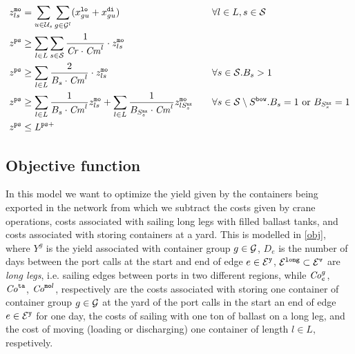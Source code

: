 \begin{alignat}{4}
\label{defMoves}
&z^\ttt{mo}_{ls} = \sum_{u\in \mc{U}_{s}}\sum_{g\in \mc{G}^l}(x^\ttt{lo}_{gu} + x^\ttt{di}_{gu}) 
																																											&&\forall l\in L, s\in \mc{S}\\
\label{minPortStay}
&z^{\ttt{ps}} \geq \sum_{l\in L}\sum_{s\in\mc{S}} \frac{1}{\mi{Cr}\cdot \mi{Cm}^{l}}\cdot z^\ttt{mo}_{ls} \\
%
\label{longCrane}
&z^{\ttt{ps}} \geq \sum_{l\in L}\frac{2}{B_{s}\cdot \mi{Cm}^{l}}\cdot z^\ttt{mo}_{ls}	&& \forall s\in\mc{S}. B_s > 1\\
%
\label{longCrane1Bay}
&z^\ttt{ps} \geq \sum_{l\in L}\frac{1}{B_s\cdot \mi{Cm}^l} z^\ttt{mo}_{ls} + \sum_{l\in L}\frac{1}{B_{S^\ttt{nx}_s}\cdot \mi{Cm}^{l}} z^\ttt{mo}_{lS^\ttt{nx}_s}\quad	
																																											&& \forall s\in\mc{S}\setminus S^\ttt{bow}. B_s = 1 \text{ or } B_{S^\ttt{nx}_s} = 1\\
\label{maxPs}
& z^\ttt{ps}\leq L^{\ttt{ps}+}																									
\end{alignat}

\subsection{Objective function}
In this model we want to optimize the yield given by the containers being exported in the network from which we subtract the costs given by crane operations, costs associated with sailing long legs with filled ballast tanks, and costs associated with storing containers at a yard. This is modelled in \eqref{obj}, where $Y^g$ is the yield associated with container group $g\in\mathcal{G}$, $D_e$ is the number of days between the port calls at the start and end of edge $e\in \mathcal{E}^\texttt{y}$, $\mathcal{E}^\texttt{long}\subset\mathcal{E}^\texttt{v}$ are \emph{long legs}, i.e. sailing edges between ports in two different regions, while $\mathit{Co}^g_{e}$, $\mathit{Co}^\texttt{ta}$, $\mathit{Co}^{\texttt{mo}l}$, respectively are the costs associated with storing one container of container group $g\in\mathcal{G}$ at the yard of the port calls in the start an end of edge $e\in\mathcal{E}^\texttt{y}$ for one day, the costs of sailing with one ton of ballast on a long leg, and the cost of moving (loading or discharging) one container of length $l\in L$, respetively.

